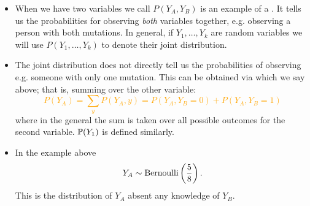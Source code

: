 \begin{itemize}
\begin{example}
\end{example}
\item When we have two variables we call $P(Y_A,Y_B)$ is an example of a . It tells us the probabilities for observing \emph{both} variables together, e.g. observing a person with both mutations. In general, if $Y_1,\dots,Y_k$ are random variables we will use $P(Y_1,\dots,Y_k)$ to denote their joint distribution.
\item The joint distribution does not directly tell us the probabilities of observing e.g. someone with only one mutation. This can be obtained via  which we say above; that is, summing over the other variable:
\textcolor{orange}{\begin{equation}
P(Y_A)  = \sum_{y}P(Y_A,y) = P(Y_A,Y_B = 0)  +P(Y_A,Y_B= 1)
\end{equation}}
where in the general the sum is taken over all possible outcomes for the second variable. $\mathbb P(Y_1)$ is defined similarly. 
\item In the example above \textcolor{orange}{
\begin{equation}
Y_A \sim {\rm Bernoulli}\left(\frac{5}{8}\right).
\end{equation}}
This is the distribution of $Y_A$ absent any knowledge of $Y_B$. 
\end{itemize}




